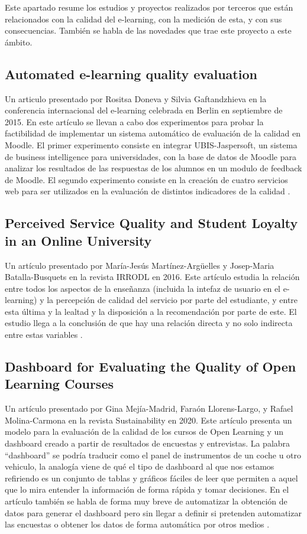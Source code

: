 
Este apartado resume los estudios y proyectos realizados por terceros que están relacionados con la calidad del e-learning, con la medición de esta, y con sus consecuencias. También se habla de las novedades que trae este proyecto a este ámbito.

\subsection{Automated e-learning quality evaluation}
Un articulo presentado por Rositsa Doneva y Silvia Gaftandzhieva en la conferencia internacional del e-learning celebrada en Berlin en septiembre de 2015.
En este artículo se llevan a cabo dos experimentos para probar la factibilidad de implementar un sistema automático de evaluación de la calidad en Moodle. El primer experimento consiste en integrar UBIS-Jaspersoft, un sistema de business intelligence para universidades, con la base de datos de Moodle para analizar los resultados de las respuestas de los alumnos en un modulo de feedback de Moodle. El segundo experimento consiste en la creación de cuatro servicios web para ser utilizados en la evaluación de distintos indicadores de la calidad \cite{doneva2015automated}.

\subsection{Perceived Service Quality and Student Loyalty in an Online University}
Un artículo presentado por María-Jesús Martínez-Argüelles y Josep-Maria Batalla-Busquets en la revista IRRODL en 2016.
Este artículo estudia la relación entre todos los aspectos de la enseñanza (incluida la intefaz de usuario en el e-learning) y la percepción de calidad del servicio por parte del estudiante, y entre esta última y la lealtad y la disposición a la recomendación por parte de este. El estudio llega a la conclusión de que hay una relación directa y no solo indirecta entre estas variables \cite{martinez2016perceived}.

\subsection{Dashboard for Evaluating the Quality of Open Learning Courses}
Un artículo presentado por Gina Mejía-Madrid, Faraón Llorens-Largo, y Rafael Molina-Carmona en la revista Sustainability en 2020.
Este artículo presenta un modelo para la evaluación de la calidad de los cursos de Open Learning y un dashboard creado a partir de resultados de encuestas y entrevistas. La palabra ``dashboard'' se podría traducir como el panel de instrumentos de un coche u otro vehiculo, la analogía viene de qué el tipo de dashboard al que nos estamos refiriendo es un conjunto de tablas y gráficos fáciles de leer que permiten a aquel que lo mira entender la información de forma rápida y tomar decisiones. En el artículo también se habla de forma muy breve de automatizar la obtención de datos para generar el dashboard pero sin llegar a definir si pretenden automatizar las encuestas o obtener los datos de forma automática por otros medios \cite{mejia2020dashboard}.

